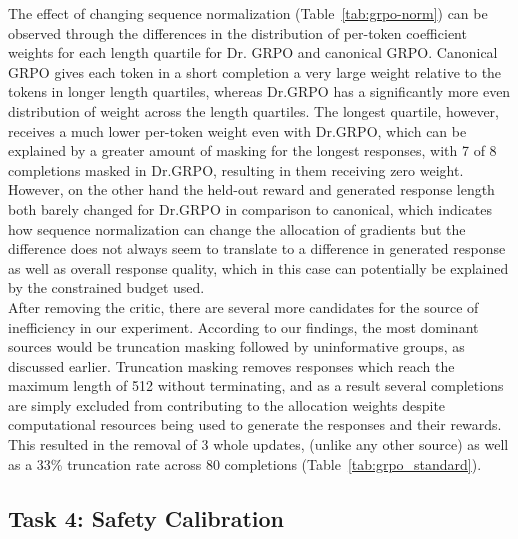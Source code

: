 \documentclass{article}
\begin{document}
 The effect of changing sequence normalization (Table~\ref{tab:grpo-norm}) can be observed through the differences in the distribution of per-token coefficient weights for each length quartile for Dr. GRPO and canonical GRPO. Canonical GRPO gives each token in a short completion a very large weight relative to the tokens in longer length quartiles, whereas Dr.GRPO has a significantly more even distribution of weight across the length quartiles. The longest quartile, however, receives a much lower per-token weight even with Dr.GRPO, which can be explained by a greater amount of masking for the longest responses, with 7 of 8 completions masked in Dr.GRPO, resulting in them receiving zero weight. However, on the other hand the held-out reward and generated response length both barely changed for Dr.GRPO in comparison to canonical, which indicates how sequence normalization can change the allocation of gradients but the difference does not always seem to translate to a difference in generated response as well as overall response quality, which in this case can potentially be explained by the constrained budget used.\\
After removing the critic, there are several more candidates for the source of inefficiency in our experiment. According to our findings, the most dominant sources would be truncation masking followed by uninformative groups, as discussed earlier. Truncation masking removes responses which reach the maximum length of 512 without terminating, and as a result several completions are simply excluded from contributing to the allocation weights despite computational resources being used to generate the responses and their rewards. This resulted in the removal of 3 whole updates, (unlike any other source) as well as a 33\% truncation rate across 80 completions (Table~\ref{tab:grpo_standard}). 




\subsection{Task 4: Safety Calibration}
\label{subsec:results-task4}
\end{document}
